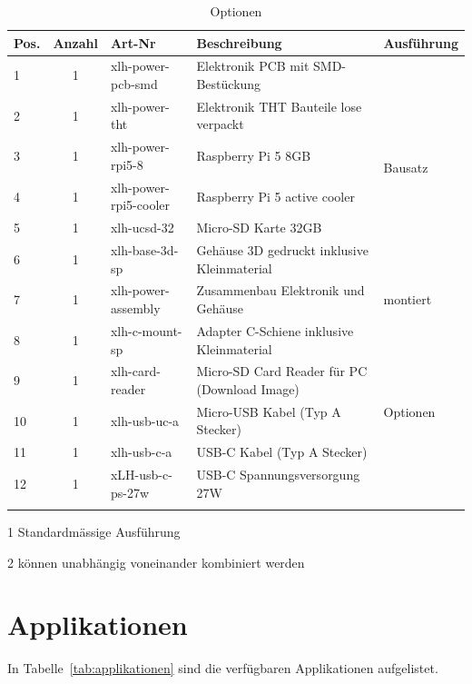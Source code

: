 \documentclass[10pt]{datasheet}
\begin{document}
\begin{table}[h]
\begin{threeparttable}
\caption{Optionen \xlhPlattformID}
    \begin{tabularx}{\textwidth}{l | c | l | l | X}

        \thickhline
        \textbf{Pos.} & \textbf{Anzahl} & \textbf{Art-Nr} & \textbf{Beschreibung} & \textbf{Ausführung} \\
        \hline
        1 & 1 & xlh-power-pcb-smd & Elektronik PCB mit SMD-Bestückung & \multirow{6}{*}{Bausatz\tnote{1}}  \\
        2 & 1 & xlh-power-tht & Elektronik THT Bauteile lose verpackt &  \\
        3 & 1 & xlh-power-rpi5-8 & Raspberry Pi 5 8GB & \\
        4 & 1 & xlh-power-rpi5-cooler & Raspberry Pi 5 active cooler & \\
        5 & 1 & xlh-ucsd-32 & Micro-SD Karte 32GB & \\
        6 & 1 & xlh-base-3d-sp & Gehäuse 3D gedruckt inklusive Kleinmaterial & \\
        \hline
        7 & 1 & xlh-power-assembly & Zusammenbau Elektronik und Gehäuse & montiert \\
        \hline
        8 & 1 & xlh-c-mount-sp & Adapter C-Schiene inklusive Kleinmaterial & \multirow{5}{*}{Optionen\tnote{2}} \\
        9 & 1 & xlh-card-reader & Micro-SD Card Reader für PC (Download Image) &  \\
        10 & 1 & xlh-usb-uc-a & Micro-USB Kabel (Typ A Stecker) &  \\
        11 & 1 & xlh-usb-c-a & USB-C Kabel (Typ A Stecker) &  \\
        12 & 1 & xLH-usb-c-ps-27w & USB-C Spannungsversorgung 27W &  \\
        \thickhline
    \end{tabularx}
\begin{tablenotes}
\item[1]{Standardmässige Ausführung}
\item[2]{können unabhängig voneinander kombiniert werden}
\end{tablenotes}
\label{tab:optionen}
\end{threeparttable}
\end{table}

\section{Applikationen}
In Tabelle~\ref{tab:applikationen} sind die verfügbaren Applikationen aufgelistet.
\end{document}
